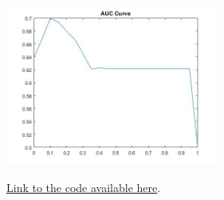 \documentclass[paper=a4, fontsize=11pt]{scrartcl} %
\numberwithin{equation}{section} %
\numberwithin{figure}{section} %
\numberwithin{table}{section} %
\begin{document}
	
	\quad\quad\quad\quad\quad\quad\quad\quad\quad\quad\quad\quad \includegraphics[width=70mm]{auc2}
		
	\href{https://github.com/AaronMG/HW4-ML}{Link to the code available here}.
\end{document}
